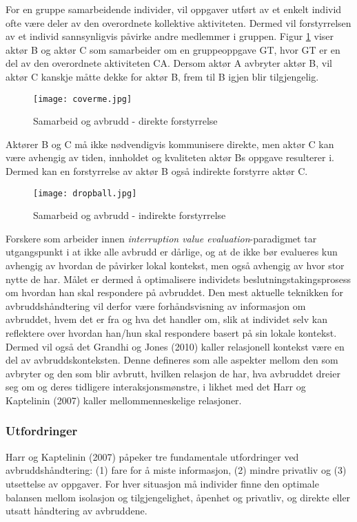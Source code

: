 \noindent
For en gruppe samarbeidende individer, vil oppgaver utført av et enkelt individ ofte være deler av den overordnete kollektive aktiviteten. Dermed vil forstyrrelsen av et individ sannsynligvis påvirke andre medlemmer i gruppen. Figur \ref{direkte} viser aktør B og aktør C som samarbeider om en gruppeoppgave GT, hvor GT er en del av den overordnete aktiviteten CA. Dersom aktør A avbryter aktør B, vil aktør C kanskje måtte dekke for aktør B, frem til B igjen blir tilgjengelig.
\begin{figure}[H]
\centering
\texttt{[image: coverme.jpg]}
\caption{Samarbeid og avbrudd - direkte forstyrrelse}
\label{direkte}
\end{figure}

\noindent
Aktører B og C må ikke nødvendigvis kommunisere direkte, men aktør C kan være avhengig av tiden, innholdet og kvaliteten aktør Bs oppgave resulterer i. Dermed kan en forstyrrelse av aktør B også indirekte forstyrre aktør C.
\begin{figure}[H]
\centering
\texttt{[image: dropball.jpg]}
\caption{Samarbeid og avbrudd - indirekte forstyrrelse}
\label{indirekte}
\end{figure}

\noindent
Forskere som arbeider innen \emph{interruption value evaluation}-paradigmet tar utgangspunkt i at ikke alle avbrudd er dårlige, og at de ikke bør evalueres kun avhengig av hvordan de påvirker lokal kontekst, men også avhengig av hvor stor nytte de har. Målet er dermed å optimalisere individets beslutningstakingsprosess om hvordan han skal respondere på avbruddet. Den mest aktuelle teknikken for avbruddshåndtering vil derfor være forhåndsvisning av informasjon om avbruddet, hvem det er fra og hva det handler om, slik at individet selv kan reflektere over hvordan han/hun skal respondere basert på sin lokale kontekst. Dermed vil også det Grandhi og Jones (2010) kaller relasjonell kontekst være en del av avbruddskonteksten. Denne defineres som alle aspekter mellom den som avbryter og den som blir avbrutt, hvilken relasjon de har, hva avbruddet dreier seg om og deres tidligere interaksjonsmønstre, i likhet med det Harr og Kaptelinin (2007) kaller mellommenneskelige relasjoner.

\subsubsection{Utfordringer}
Harr og Kaptelinin (2007) påpeker tre fundamentale utfordringer ved avbruddshåndtering: (1) fare for å miste informasjon, (2) mindre privatliv og (3) utsettelse av oppgaver. For hver situasjon må individer finne den optimale balansen mellom isolasjon og tilgjengelighet, åpenhet og privatliv, og direkte eller utsatt håndtering av avbruddene.